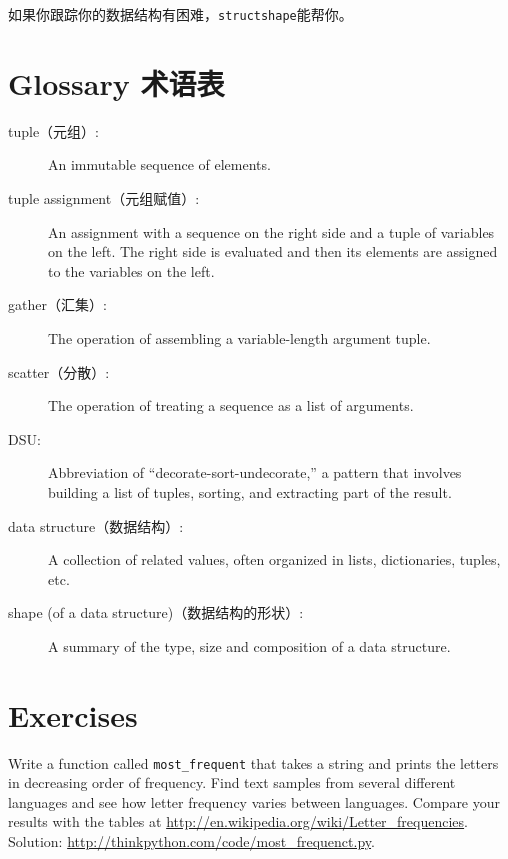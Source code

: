 \documentclass[10pt]{book}
\begin{document}
\begin{CJK}{UTF8}{gbsn}
如果你跟踪你的数据结构有困难，{\tt structshape}能帮你。


\section{Glossary 术语表}

\begin{description}

\item[tuple（元组）:] An immutable sequence of elements.

\item[tuple assignment（元组赋值）:] An assignment with a sequence on the
right side and a tuple of variables on the left.  The right
side is evaluated and then its elements are assigned to the
variables on the left.

\item[gather（汇集）:] The operation of assembling a variable-length
argument tuple.

\item[scatter（分散）:] The operation of treating a sequence as a list of
arguments.

\item[DSU:] Abbreviation of ``decorate-sort-undecorate,'' a
pattern that involves building a list of tuples, sorting, and
extracting part of the result.

\item[data structure（数据结构）:] A collection of related values, often
organized in lists, dictionaries, tuples, etc.

\item[shape (of a data structure)（数据结构的形状）:] A summary of the type,
size and composition of a data structure.

\end{description}


\section{Exercises}

\begin{exercise}

Write a function called \verb"most_frequent" that takes a string and
prints the letters in decreasing order of frequency.  Find text
samples from several different languages and see how letter frequency
varies between languages.  Compare your results with the tables at
\url{http://en.wikipedia.org/wiki/Letter_frequencies}.  Solution:
\url{http://thinkpython.com/code/most_frequenct.py}.   


\end{exercise}
\end{CJK}
\end{document}
